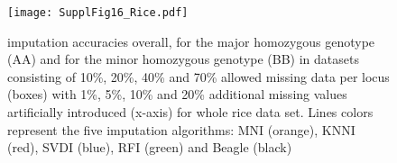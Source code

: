 \begin{figure}\texttt{[image: SupplFig16\_Rice.pdf]}\caption{
imputation accuracies overall, for the major homozygous genotype (AA) and for the minor homozygous genotype (BB) in datasets consisting of
10\%, 20\%, 40\% and 70\% allowed missing data per locus (boxes) with 1\%, 5\%, 10\% and 20\%
additional missing values artificially introduced (x-axis) for whole rice data set.
Lines colors represent the five imputation algorithms: MNI
(orange), KNNI (red), SVDI (blue), RFI (green) and Beagle (black)}\end{figure}
